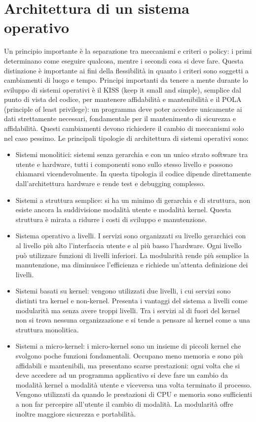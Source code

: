 \chapter{Architettura di un sistema operativo}
Un principio importante \`e la separazione tra meccanismi e criteri o policy: i primi determinano come eseguire qualcosa, mentre i secondi cosa si deve fare. Questa distinzione \`e importante ai fini della
flessibilit\`a in quanto i criteri sono soggetti a cambiamenti di luogo e tempo. Principi importanti da tenere a mente durante lo sviluppo di sistemi operativi \`e il KISS (keep it small
and simple), semplice dal punto di vista del codice, per mantenere affidabilit\`a e mantenibilit\`a e il POLA (principle of least privilege): un programma deve poter accedere unicamente ai
dati strettamente necessari, fondamentale per il mantenimento di sicurezza e affidabilit\`a. Questi cambiamenti devono richiedere il cambio di meccanismi solo nel caso pessimo. Le 
principali tipologie di architettura di sistemi operativi sono:
\begin{itemize}
	\item Sistemi monolitici: sistemi senza gerarchia e con un unico strato software tra utente e hardware, tutti i componenti sono sullo stesso 
		livello e possono chiamarsi vicendevolmente. In questa tipologia il codice dipende direttamente dall'architettura hardware e rende test
		e debugging complesso.
	\item Sistemi a struttura semplice: si ha un minimo di gerarchia e di struttura, non esiste  ancora la suddivisione modalità utente e modalità kernel. Questa struttura \`e mirata a ridurre i costi di sviluppo e manutenzione.
	\item Sistema operativo a livelli. I servizi sono organizzati su livello gerarchici con al livello pi\`u alto l'interfaccia utente e al pi\`u 
		basso l'hardware. Ogni livello pu\`o utilizzare funzioni di livelli inferiori. La modularit\`a rende pi\`u semplice la manutenzione, ma
		diminuisce l'efficienza e richiede un'attenta definizione dei livelli. 
	\item Sistemi basati su kernel: vengono utilizzati due livelli, i cui servizi sono distinti tra kernel e non-kernel. Presenta i vantaggi del sistema a livelli come modularit\`a
		ma senza avere troppi livelli. Tra i servizi al di fuori del kernel non si trova nessuna organizzazione e si tende a pensare al kernel come a una struttura monolitica.
	\item Sistemi a micro-kernel: i micro-kernel sono un insieme di piccoli kernel che svolgono poche funzioni fondamentali. Occupano meno memoria e sono pi\`u affidabili e 
		mantenibili, ma presentano scarse prestazioni: ogni volta che si deve accedere ad un programma applicativo si deve fare un cambio da modalit\`a kernel a modalit\`a
		utente e viceversa una volta terminato il processo. Vengono utilizzati da quando le prestazioni di CPU e memoria sono sufficienti a non far percepire all'utente il cambio
		di modalit\`a. La modularit\`a offre inoltre maggiore sicurezza e portabilit\`a.
\end{itemize}
